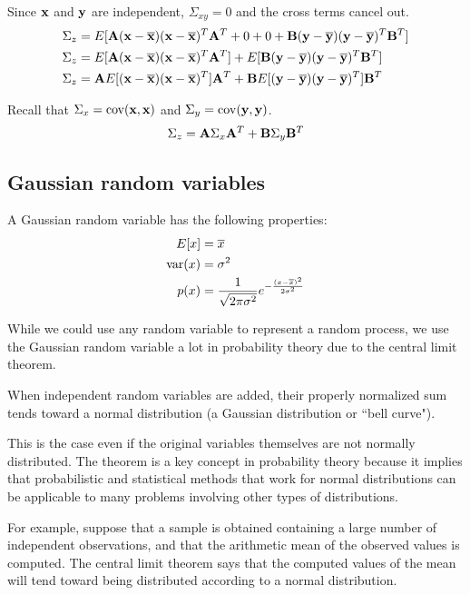 Since $\mathbf{x}$ and $\mathbf{y}$ are independent, $\Sigma_{xy} = 0$ and the cross
terms cancel out.
\begin{align*}
  \Sigma_z &= E[
    \mathbf{A}(\mathbf{x} - \overline{\mathbf{x}})(\mathbf{x} - \overline{\mathbf{x}})^T\mathbf{A}^T + 0 + 0 +
    \mathbf{B}(\mathbf{y} - \overline{\mathbf{y}})(\mathbf{y} - \overline{\mathbf{y}})^T\mathbf{B}^T] \\
  \Sigma_z &=
    E[\mathbf{A}(\mathbf{x} - \overline{\mathbf{x}})(\mathbf{x} - \overline{\mathbf{x}})^T\mathbf{A}^T] +
    E[\mathbf{B}(\mathbf{y} - \overline{\mathbf{y}})(\mathbf{y} - \overline{\mathbf{y}})^T\mathbf{B}^T] \\
  \Sigma_z &=
    \mathbf{A}E[(\mathbf{x} - \overline{\mathbf{x}})(\mathbf{x} - \overline{\mathbf{x}})^T]\mathbf{A}^T +
    \mathbf{B}E[(\mathbf{y} - \overline{\mathbf{y}})(\mathbf{y} - \overline{\mathbf{y}})^T]\mathbf{B}^T
\end{align*}

Recall that $\Sigma_x = \operatorname{cov}(\mathbf{x}, \mathbf{x})$ and
$\Sigma_y = \operatorname{cov}(\mathbf{y}, \mathbf{y})$.
\begin{equation*}
  \Sigma_z = \mathbf{A}\Sigma_x\mathbf{A}^T + \mathbf{B}\Sigma_y\mathbf{B}^T
\end{equation*}

\subsection{Gaussian random variables}

A Gaussian random variable has the following properties:
\begin{align*}
  E[x] &= \overline{x} \\
  \operatorname{var}(x) &= \sigma^2 \\
  p(x) &= \frac{1}{\sqrt{2\pi\sigma^2}}
    e^{-\frac{(x - \overline{x})^2}{2\sigma^2}}
\end{align*}

While we could use any random variable to represent a random process, we use the
Gaussian random variable a lot in probability theory due to the central limit
theorem.
\begin{definition}
  When independent random variables are added, their properly normalized sum
  tends toward a normal distribution (a Gaussian distribution or ``bell curve").
\end{definition}

This is the case even if the original variables themselves are not normally
distributed. The theorem is a key concept in probability theory because it
implies that probabilistic and statistical methods that work for normal
distributions can be applicable to many problems involving other types of
distributions.

For example, suppose that a sample is obtained containing a large number of
independent observations, and that the arithmetic mean of the observed values
is computed. The central limit theorem says that the computed values of the
mean will tend toward being distributed according to a normal distribution.
